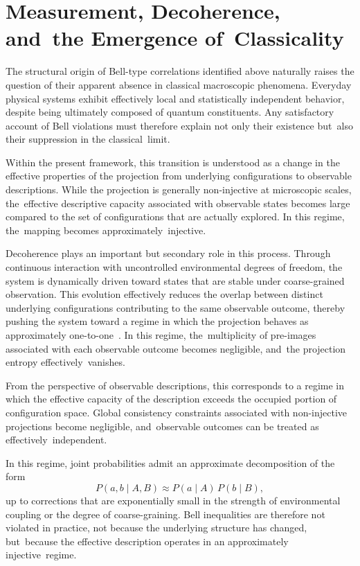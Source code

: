 \documentclass[11pt,a4paper]{article}
\theoremstyle{remark}
\begin{document}
  \section{Measurement, Decoherence, and~the Emergence of~Classicality}
  \label{sec:classical-limit}

  The structural origin of Bell-type correlations identified above naturally raises
  the question of their apparent absence in classical macroscopic phenomena.
  Everyday physical systems exhibit effectively local and statistically independent
  behavior, despite being ultimately composed of quantum constituents.
  Any satisfactory account of Bell violations must therefore explain not only their
  existence but~also their suppression in the classical~limit.

  Within the present framework, this transition is understood as a change in the
  effective properties of the projection from underlying configurations to observable
  descriptions.
  While the projection is generally non-injective at microscopic scales, the~effective
  descriptive capacity associated with observable states becomes large compared to the
  set of configurations that are actually explored.
  In this regime, the~mapping becomes approximately~injective.

  Decoherence plays an important but secondary role in this process.
  Through continuous interaction with uncontrolled environmental degrees of freedom,
  the system is dynamically driven toward states that are stable under coarse-grained
  observation.
  This evolution effectively reduces the overlap between distinct underlying
  configurations contributing to the same observable outcome, thereby pushing the
  system toward a regime in which the projection behaves as approximately one-to-one~\cite{Zurek2003}.
  In this regime, the~multiplicity of pre-images associated with each observable outcome
  becomes negligible, and~the projection entropy effectively~vanishes.

  From the perspective of observable descriptions, this corresponds to a regime in
  which the effective capacity of the description exceeds the occupied portion of
  configuration space.
  Global consistency constraints associated with non-injective projections become
  negligible, and~observable outcomes can be treated as effectively~independent.

  In this regime, joint probabilities admit an approximate decomposition of the form
\begin{equation}
    P(a,b \mid A,B) \approx P(a \mid A)\,P(b \mid B),
  \end{equation}
  up to corrections that are exponentially small in the strength of environmental
  coupling or the degree of coarse-graining.
  Bell inequalities are therefore not violated in practice, not because the underlying
  structure has changed, but~because the effective description operates in an
  approximately injective~regime.
\end{document}
